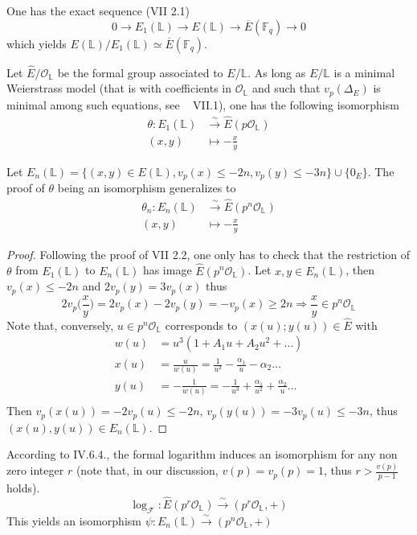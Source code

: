 \documentclass[10pt]{article}
\theoremstyle{definition}
\newcommand{\F}{\mathbb{F}}
\renewcommand{\L}{\mathbb{L}}
\begin{document}
One has the exact sequence \cite{Silverman:EC} (VII 2.1)
\[ 0 \to E_1(\L) \to E(\L) \to \overline{E}(\F_q) \to 0 \]
which yields $E(\L) / E_1(\L) \simeq \overline{E}(\F_q)$.

Let $\hat{E} / \mathcal{O}_{\L}$ be the formal group associated to $E/\L$.
As long as $E/ \L$ is a minimal Weierstrass model (that is with coefficients in $\mathcal{O}_{\L}$ and such that $v_p(\Delta_{E})$ is minimal among such equations, see  \cite{Silverman:EC} VII.1), one has the following isomorphism 
\begin{align*} \theta : E_1(\L) &\xrightarrow{\sim} \hat{E}(p\mathcal{O}_{\L})\\
                   (x,y)& \mapsto - \frac{x}{y} 
\end{align*} 

\noindent Let $E_n(\L)= \lbrace (x,y) \in E(\L), v_p(x) \leq -2n, v_p(y) \leq -3n \rbrace \cup \lbrace 0_E \rbrace$.
The proof of $\theta$ being an isomorphism generalizes to 
\begin{align*} \theta_n : E_n(\L) &\xrightarrow{\sim} \hat{E}(p^n\mathcal{O}_{\L})\\
                   (x,y)& \mapsto - \frac{x}{y} 
\end{align*} 

\begin{proof}
Following the proof of \cite{Silverman:EC} VII 2.2, one only has to check that the restriction of $\theta$ from $E_1(\L)$ to $E_n(\L)$ has image  $\hat{E}(p^n\mathcal{O}_{\L})$.
Let $x,y \in E_n(\L)$, then $v_p(x) \leq -2n $ and $2v_p(y) = 3v_p(x)$ thus
\[ 2v_p\big(\frac{x}{y}\big) = 2 v_p(x) - 2v_p(y) = -v_p(x) \geq 2n  \Rightarrow \frac{x}{y} \in p^n\mathcal{O}_{\L} \]
Note that, conversely, $ u \in p^n \mathcal{O}_{\L}$ corresponds to $(x(u);y(u)) \in \hat{E}$ with
\begin{align*}
w(u) &= u^3(1+A_1u+A_2u^2+ \dots )\\
x(u) & = \frac{u}{w(u)}= \frac{1}{u^2} - \frac{\alpha_1}{u} - \alpha_2 \dots \\
y(u) &= -\frac{1}{w(u)} = -\frac{1}{u^3} + \frac{\alpha_1}{u^2} + \frac{ \alpha_2}{u} \dots \\
\end{align*}
Then $v_p(x(u)) = -2v_p(u) \leq -2n$, $v_p(y(u)) = -3v_p(u) \leq -3n$, thus $(x(u),y(u)) \in E_n(\L)$.
\end{proof}

According to \cite{Silverman:EC} IV.6.4., the formal logarithm induces an isomorphism for any non zero integer $r$ (note that, in our discussion, $v(p) =v_p(p)= 1$, thus $r > \frac{v(p)}{p-1}$ holds). 
\[ \log_{\mathcal{F}} : \hat{E}(p^r\mathcal{O}_{\L}) \xrightarrow{\sim} (p^r\mathcal{O}_{\L},+) \]
This yields an isomorphism $\psi  : E_n(\L) \xrightarrow{\sim} (p^n\mathcal{O}_{\L},+)$
\end{document}
